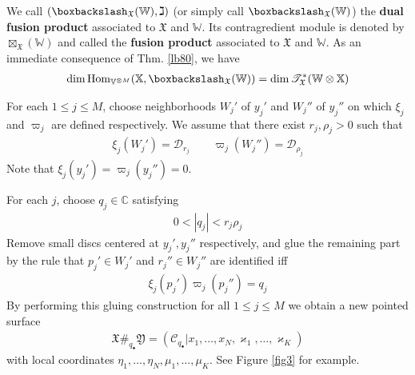 \documentclass[11pt,b5paper,notitlepage]{article}
\theoremstyle{definition}
\theoremstyle{plain}
\newcommand{\fk}{\mathfrak}
\newcommand{\mc}{\mathcal}
\newcommand{\Hom}{\mathrm{Hom}}
\newcommand{\scr}{\mathscr}
\newcommand{\blt}{\bullet}
\newcommand{\Vbb}{\mathbb V}
\newcommand{\Xbb}{\mathbb X}
\newcommand{\Wbb}{\mathbb W}
\newcommand{\Cbb}{\mathbb C}
\newcommand{\<}{\left\langle}
\renewcommand{\>}{\right\rangle}
\newcommand{\fx}{\mathfrak{X}}
\newcommand{\bbs}{\boxbackslash}
\numberwithin{equation}{section}
\begin{document}
We call $(\bbs_\fx(\Wbb),\gimel)$ (or simply call $\bbs_\fx(\Wbb)$) the \textbf{dual fusion product} associated to $\fx$ and $\Wbb$. Its contragredient module is denoted by $\boxtimes_\fx(\Wbb)$ and called the \textbf{fusion product} associated to $\fx$ and $\Wbb$. As an immediate consequence of Thm. \ref{lb80}, we have
\begin{align}\label{eq167}
\dim\Hom_{\Vbb^{\otimes M}}(\Xbb,\bbs_\fx(\Wbb))=\dim\scr T_\fx^*(\Wbb\otimes\Xbb)
\end{align}



For each $1\leq j\leq M$, choose neighborhoods $W_j'$ of $y_j'$ and  $W_j''$ of $y_j''$ on which $\xi_j$ and $\varpi_j$ are defined respectively. We assume that there exist $r_j,\rho_j>0$ such that
\begin{align}
\xi_j(W_j')=\mc D_{r_j}\qquad \varpi_j(W_j'')=\mc D_{\rho_j}
\end{align}
Note that $\xi_j(y_j')=\varpi_j(y_j'')=0$.

For each $j$, choose $q_j\in\Cbb$ satisfying
\begin{align}
0<|q_j|<r_j\rho_j
\end{align}
Remove small discs centered at $y_j',y_j''$ respectively, and glue the remaining part by the rule that $p_j'\in W_j'$ and $r_j''\in W_j''$ are identified iff
\begin{align}
\xi_j(p_j')\varpi_j(p_j'')=q_j
\end{align} 
By performing this gluing construction for all $1\leq j\leq M$ we obtain a new pointed surface
\begin{align}
\fx\#_{q_\blt}\fk Y=(\mc C_{q_\blt}|x_1,\dots,x_N,\varkappa_1,\dots,\varkappa_K)
\end{align}
with local coordinates $\eta_1,\dots,\eta_N,\mu_1,\dots,\mu_K$. See Figure \ref{fig3} for example.
\end{document}
